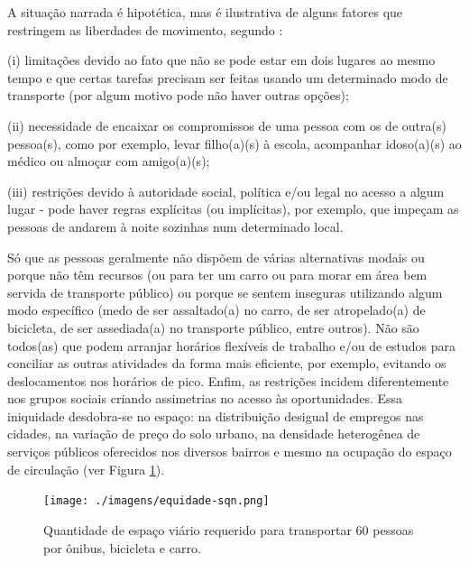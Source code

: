 A situação narrada é hipotética, mas é ilustrativa de alguns fatores que restringem as liberdades de movimento, segundo :
\begin{compactitem}
\item (i) limitações devido ao fato que não se pode estar em dois lugares ao mesmo tempo e que certas tarefas precisam ser feitas usando um determinado modo de transporte (por algum motivo pode não haver outras opções);
\item (ii) necessidade de encaixar os compromissos de uma pessoa com os de outra(s) pessoa(s), como por exemplo, levar filho(a)(s) à escola, acompanhar idoso(a)(s) ao médico ou almoçar com amigo(a)(s);
\item (iii) restrições devido à autoridade social, política e/ou legal no acesso a algum lugar - pode haver regras explícitas (ou implícitas), por exemplo, que impeçam as pessoas de andarem à noite sozinhas num determinado local.
\end{compactitem}

Só que as pessoas geralmente não dispõem de várias alternativas modais ou porque não têm recursos (ou para ter um carro ou para morar em área bem servida de transporte público) ou porque se sentem inseguras utilizando algum modo específico (medo de ser assaltado(a) no carro, de ser atropelado(a) de bicicleta, de ser assediada(a) no transporte público, entre outros). Não são todos(as) que podem arranjar horários flexíveis de trabalho e/ou de estudos para conciliar as outras atividades da forma mais eficiente, por exemplo, evitando os deslocamentos nos horários de pico. Enfim, as restrições incidem diferentemente nos grupos sociais criando assimetrias no acesso às oportunidades. Essa iniquidade desdobra-se no espaço: na distribuição desigual de empregos nas cidades, na variação de preço do solo urbano, na densidade heterogênea de serviços públicos oferecidos nos diversos bairros e mesmo na ocupação do espaço de circulação (ver Figura \ref{fig:equidade}).

\clearpage

\begin{figure}[htb]%
    \caption{\label{fig:equidade}Quantidade de espaço viário requerido para transportar 60 pessoas por ônibus, bicicleta e carro.}%
    \begin{center}%
        \texttt{[image: ./imagens/equidade-sqn.png]}%
    \end{center}%
\end{figure}%

